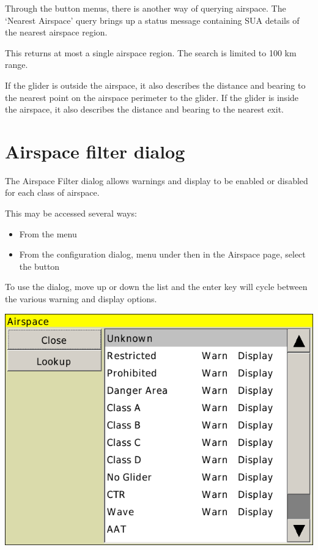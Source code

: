 \documentclass[a4paper,12pt]{refrep}
\begin{document}
Through the button menus, there is another way of querying airspace.
The `Nearest Airspace' query brings up a status message containing SUA
details of the nearest airspace region. 
\begin{quote}
\blink{}
\end{quote}
This returns at most a single airspace region.  The search is limited
to  100 km range.

If the glider is outside the airspace, it also describes the distance
and bearing to the nearest point on the airspace perimeter to the
glider.  If the glider is inside the airspace, it also describes the
distance and bearing to the nearest exit.

\section{Airspace filter dialog}\label{sec:airsp-filt-dial}

The Airspace Filter dialog allows warnings and display to be enabled
or disabled for each class of airspace.  

This may be accessed several ways:
\begin{itemize}
\item From the menu \blink{}\blink{}
\item From the configuration dialog, menu under
\blink{}\blink{} then in the
Airspace page, select the button 
\end{itemize}

To use the dialog, move up or down the list and the enter key will
cycle between the various warning and display options.

\begin{center}
\includegraphics[angle=0,width=0.8\linewidth,keepaspectratio='true']{figures/airspacefilter.png}
\end{center}
\end{document}
